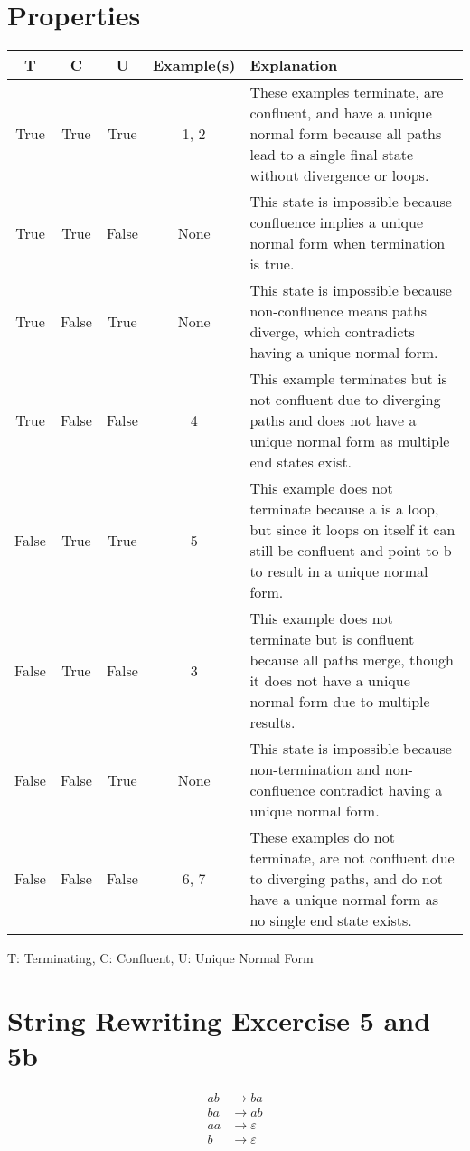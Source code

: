 \documentclass{article}
\begin{document}
\section*{Properties}
\begin{tabular}{c c c c p{8cm}}
     T & C & U & Example(s) & Explanation \\ \hline
    True & True & True & 1, 2 & These examples terminate, are confluent, and have a unique normal form because all paths lead to a single final state without divergence or loops. \\
    True & True & False & None & This state is impossible because confluence implies a unique normal form when termination is true. \\
    True & False & True & None & This state is impossible because non-confluence means paths diverge, which contradicts having a unique normal form. \\
    True & False & False & 4 & This example terminates but is not confluent due to diverging paths and does not have a unique normal form as multiple end states exist. \\
    False & True & True & 5 & This example does not terminate because a is a loop, but since it loops on itself it can still be confluent and point to b to result in a unique normal form. \\
    False & True & False & 3 & This example does not terminate but is confluent because all paths merge, though it does not have a unique normal form due to multiple results. \\
    False & False & True & None & This state is impossible because non-termination and non-confluence contradict having a unique normal form. \\
    False & False & False &  6, 7 & These examples do not terminate, are not confluent due to diverging paths, and do not have a unique normal form as no single end state exists. \\
\end{tabular}

\vspace{4em}
\noindent T: Terminating, C: Confluent, U: Unique Normal Form

\newpage
\section{String Rewriting Excercise 5 and 5b}

\[
\begin{aligned}
  ab &\to ba \\
  ba &\to ab \\
  aa &\to \varepsilon \\
  b &\to \varepsilon
\end{aligned}
\]
\end{document}
